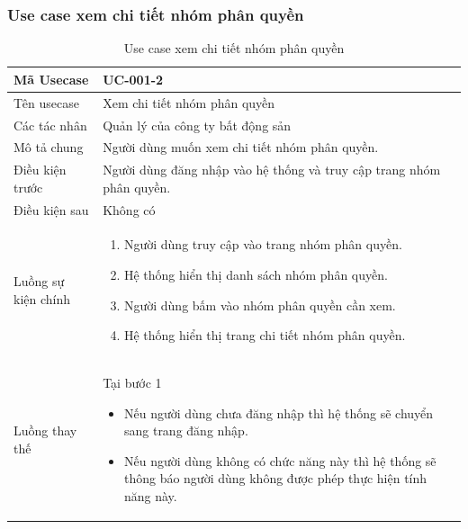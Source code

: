 \documentclass[12pt,a4paper]{article}
\begin{document}
    \subsubsection*{Use case xem chi tiết nhóm phân quyền }
    \begin{table}[H]
        \centering
        \begin{tabular}{|p{3.5cm}|p{11.5cm}|c|}
            \hline
            Mã Usecase      & UC-001-2                                                             \\
            \hline
            Tên usecase     & Xem chi tiết nhóm phân quyền                                         \\
            \hline
            Các tác nhân    & Quản lý của công ty bất động sản                                     \\
            \hline
            Mô tả chung     & Người dùng muốn xem chi tiết nhóm phân quyền.                        \\
            \hline
            Điều kiện trước & Người dùng đăng nhập vào hệ thống và truy cập trang nhóm phân quyền. \\
            \hline
            Điều kiện sau   & Không có                                                             \\
            \hline
            Luồng sự kiện chính & \vspace{-.8cm}\begin{enumerate}
                                                    \item Người dùng truy cập vào trang nhóm phân quyền.
                                                    \item Hệ thống hiển thị danh sách nhóm phân quyền.
                                                    \item Người dùng bấm vào nhóm phân quyền cần xem.
                                                    \item Hệ thống hiển thị trang chi tiết nhóm phân quyền.
            \end{enumerate}
            \\
            \hline
            Luồng thay thế & Tại bước 1\newline
            \vspace{-.8cm}\begin{itemize}
                              \item Nếu người dùng chưa đăng nhập thì hệ thống sẽ chuyển sang trang đăng nhập.
                              \item  Nếu người dùng không có chức năng này thì hệ thống sẽ thông báo người dùng không được phép thực hiện tính năng này.
            \end{itemize}
            \\    \hline
        \end{tabular}
        \caption{Use case xem chi tiết nhóm phân quyền }
    \end{table}
\end{document}
